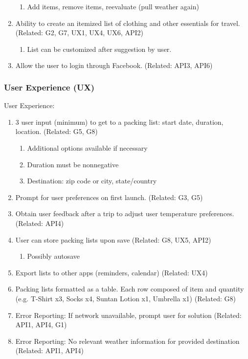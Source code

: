\documentclass[11pt]{article}
\begin{document}
\begin{enumerate}
        \begin{enumerate}
        \item Add items, remove items, reevaluate (pull weather again) 
        \end{enumerate}
        \item Ability to create an itemized list of clothing and other essentials
        for travel. (Related: G2, G7, UX1, UX4, UX6, API2)

        \begin{enumerate}
        \item List can be customized after suggestion by user.
        \end{enumerate}
        \item Allow the user to login through Facebook. (Related: API3, API6)
        \end{enumerate}
        \subsubsection{User Experience (UX)}
        User Experience:
        \begin{enumerate}
        \item 3 user input (minimum) to get to a packing list: start date, duration,
        location. (Related: G5, G8)

        \begin{enumerate}
        \item Additional options available if necessary
        \item Duration must be nonnegative
        \item Destination: zip code or city, state/country
        \end{enumerate}
        \item Prompt for user preferences on first launch. (Related: G3, G5)
        \item Obtain user feedback after a trip to adjust user temperature preferences.
        (Related: API4)
        \item User can store packing lists upon save (Related: G8, UX5, API2)

        \begin{enumerate}
        \item Possibly autosave
        \end{enumerate}
        \item Export lists to other apps (reminders, calendar) (Related: UX4)
        \item Packing lists formatted as a table. Each row composed of item and
        quantity (e.g. T-Shirt x3, Socks x4, Suntan Lotion x1, Umbrella x1)
        (Related: G8)
        \item Error Reporting: If network unavailable, prompt user for solution
        (Related: API1, API4, G1)
        \item Error Reporting: No relevant weather information for provided destination
        (Related: API1, API4)
        \end{enumerate}
\end{document}

